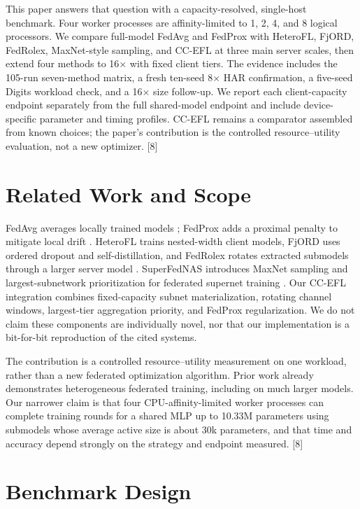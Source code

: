 \documentclass[conference]{IEEEtran}
\begin{document}
This paper answers that question with a capacity-resolved, single-host benchmark. Four worker processes are affinity-limited to 1, 2, 4, and 8 logical processors. We compare full-model FedAvg and FedProx with HeteroFL, FjORD, FedRolex, MaxNet-style sampling, and CC-EFL at three main server scales, then extend four methods to 16$\times$ with fixed client tiers. The evidence includes the 105-run seven-method matrix, a fresh ten-seed 8$\times$ HAR confirmation, a five-seed Digits workload check, and a 16$\times$ size follow-up. We report each client-capacity endpoint separately from the full shared-model endpoint and include device-specific parameter and timing profiles. CC-EFL remains a comparator assembled from known choices; the paper's contribution is the controlled resource--utility evaluation, not a new optimizer. [8]

\section{Related Work and Scope}
FedAvg averages locally trained models \cite{mcmahan}; FedProx adds a proximal penalty to mitigate local drift \cite{fedprox}. HeteroFL trains nested-width client models, FjORD uses ordered dropout and self-distillation, and FedRolex rotates extracted submodels through a larger server model \cite{heterofl,fjord,fedrolex}. SuperFedNAS introduces MaxNet sampling and largest-subnetwork prioritization for federated supernet training \cite{superfednas}. Our CC-EFL integration combines fixed-capacity subnet materialization, rotating channel windows, largest-tier aggregation priority, and FedProx regularization. We do not claim these components are individually novel, nor that our implementation is a bit-for-bit reproduction of the cited systems.

The contribution is a controlled resource--utility measurement on one workload, rather than a new federated optimization algorithm. Prior work already demonstrates heterogeneous federated training, including on much larger models. Our narrower claim is that four CPU-affinity-limited worker processes can complete training rounds for a shared MLP up to 10.33M parameters using submodels whose average active size is about 30k parameters, and that time and accuracy depend strongly on the strategy and endpoint measured. [8]

\section{Benchmark Design}
\end{document}
